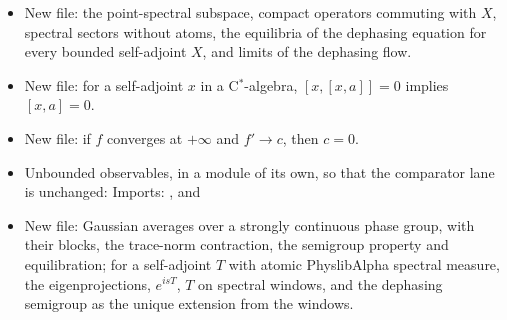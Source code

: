 \documentclass[11pt]{article}
\begin{document}
\begin{itemize}
\item New file:\newline {}\newline
  the point-spectral subspace, compact operators commuting with $X$, spectral sectors without
  atoms, the equilibria of the dephasing equation for every bounded self-adjoint $X$, and limits
  of the dephasing flow.
\item New file:\newline {}\newline
  for a self-adjoint $x$ in a C$^*$-algebra, $[x, [x, a]] = 0$ implies $[x, a] = 0$.
\item New file:\newline {}\newline
  if $f$ converges at $+\infty$ and $f' \to c$, then $c = 0$.
\item {\raggedright Unbounded observables, in a module of its own, so that the comparator lane is
  unchanged:\newline
  \newline
  Imports: ,\newline
   and\newline
  \par}
\item New file:\newline {}\newline
  Gaussian averages over a strongly continuous phase group, with their blocks, the trace-norm
  contraction, the semigroup property and equilibration; for a self-adjoint $T$ with atomic
  PhyslibAlpha spectral measure, the eigenprojections, $e^{isT}$, $T$ on spectral windows, and
  the dephasing semigroup as the unique extension from the windows.
\end{itemize}
\end{document}

